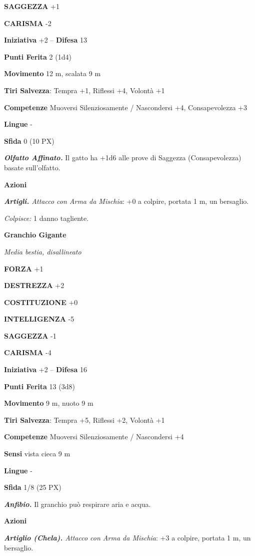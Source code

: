\begin{multicols}{2}
	\textbf{SAGGEZZA} +1

	\textbf{CARISMA} -2

	\textbf{Iniziativa} +2 -- \textbf{Difesa} 13

	\textbf{Punti Ferita} 2 (1d4)

	\textbf{Movimento} 12 m, scalata 9 m

	\textbf{Tiri Salvezza}: Tempra +1, Riflessi +4, Volontà +1

	\textbf{Competenze} Muoversi Silenziosamente / Nascondersi +4, Consapevolezza +3

	\textbf{Lingue} -

	\textbf{Sfida} 0 (10 PX)

	\textit{\textbf{Olfatto Affinato.}} Il gatto ha +1d6 alle prove di Saggezza (Consapevolezza) basate sull'olfatto.

	\textbf{Azioni}

	\textit{\textbf{Artigli.} Attacco con Arma da Mischia}: +0 a colpire, portata 1 m, un bersaglio.

	\textit{Colpisce:} 1 danno tagliente.

	\medskip\textbf{Granchio Gigante}

	\textit{Media bestia, disallineato}

	\textbf{FORZA} +1

	\textbf{DESTREZZA} +2

	\textbf{COSTITUZIONE} +0

	\textbf{INTELLIGENZA} -5

	\textbf{SAGGEZZA} -1

	\textbf{CARISMA} -4

	\textbf{Iniziativa} +2 -- \textbf{Difesa} 16

	\textbf{Punti Ferita} 13 (3d8)

	\textbf{Movimento} 9 m, nuoto 9 m

	\textbf{Tiri Salvezza}: Tempra +5, Riflessi +2, Volontà +1

	\textbf{Competenze} Muoversi Silenziosamente / Nascondersi +4

	\textbf{Sensi} vista cieca 9 m

	\textbf{Lingue} -

	\textbf{Sfida} 1/8 (25 PX)

	\textit{\textbf{Anfibio.}} Il granchio può respirare aria e acqua.

	\textbf{Azioni}

	\textit{\textbf{Artiglio (Chela).} Attacco con Arma da Mischia}: +3 a colpire, portata 1 m, un bersaglio.


\end{multicols}
